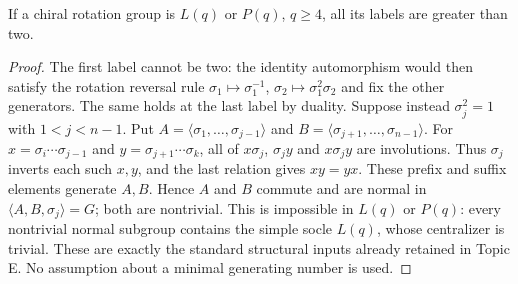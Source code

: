 \begin{lemma}\label{E.NoTwoLabel}
If a chiral rotation group is $L(q)$ or $P(q)$, $q\ge4$, all its labels
are greater than two.
\end{lemma}
\begin{proof}
The first label cannot be two: the identity automorphism would then
satisfy the rotation reversal rule
$\sigma_1\mapsto\sigma_1^{-1}$,
$\sigma_2\mapsto\sigma_1^2\sigma_2$ and fix the other generators.
The same holds at the last label by duality.
Suppose instead $\sigma_j^2=1$ with $1<j<n-1$. Put
$A=\langle\sigma_1,\ldots,\sigma_{j-1}\rangle$ and
$B=\langle\sigma_{j+1},\ldots,\sigma_{n-1}\rangle$.
For $x=\sigma_i\cdots\sigma_{j-1}$ and
$y=\sigma_{j+1}\cdots\sigma_k$, all of $x\sigma_j$, $\sigma_j y$
and $x\sigma_j y$ are involutions. Thus $\sigma_j$ inverts each
such $x,y$, and the last relation gives $xy=yx$. These prefix and
suffix elements generate $A,B$. Hence $A$ and $B$ commute and are
normal in $\langle A,B,\sigma_j\rangle=G$; both are nontrivial.
This is impossible in $L(q)$ or $P(q)$: every nontrivial normal subgroup
contains the simple socle $L(q)$, whose centralizer is trivial.
These are exactly the standard structural inputs already retained in
Topic E. No assumption about a minimal generating number is used.
\end{proof}

